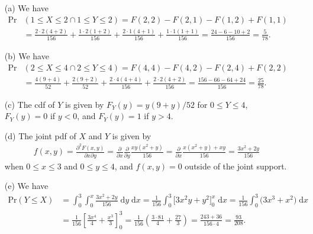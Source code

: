 \documentclass[10pt]{article}
\begin{document}
\begin{itemize}
    \item[(a)] We have 
    \begin{align*}
        \mathrm{Pr}&(1 \le X \le 2 \cap 1 \le Y \le 2)
        = F(2,2) - F(2,1) - F(1,2) + F(1,1) \\
        &= \frac{2 \cdot 2 (4 + 2)}{156} + \frac{1 \cdot 2 (1 + 2)}{156} + \frac{2 \cdot 1 (4 + 1)}{156} + \frac{1 \cdot 1 (1 + 1)}{156}
        = \frac{24 - 6 - 10 + 2}{156}
        = \frac{5}{78}.
    \end{align*}
    \item[(b)] We have 
    \begin{align*}
        \mathrm{Pr}&(2 \le X \le 4 \cap 2 \le Y \le 4) 
        = F(4,4) - F(4,2) - F(2,4) + F(2,2) \\
        &= \frac{4 (9 + 4)}{52} + \frac{2 (9 + 2)}{52} + \frac{2 \cdot 4 (4 + 4)}{156} + \frac{2 \cdot 2 (4 + 2)}{156}
        = \frac{156 - 66 - 64 + 24}{156}
        = \frac{25}{78}.
    \end{align*}
    \item[(c)] The cdf of \(Y\) is given by \(F_Y(y) = y(9 + y)/52\) for \(0 \le Y \le 4\), \(F_Y(y) = 0\) if \(y < 0\), and \(F_Y(y) = 1\) if \(y > 4\).
    \item[(d)] The joint pdf of \(X\) and \(Y\) is given by 
    \begin{align*}
        f(x,y) = \frac{\partial^2 F(x,y)}{\partial x \partial y} 
        = \frac{\partial}{\partial x} \frac{\partial}{\partial y} \frac{xy(x^2 + y)}{156} 
        = \frac{\partial}{\partial x} \frac{x(x^2 + y) + xy}{156}
        = \frac{3x^2 + 2y}{156}
    \end{align*}
    when \(0 \le x \le 3\) and \(0 \le y \le 4\), and \(f(x,y) = 0\) outside of the joint support. 
    \item[(e)] We have 
    \begin{align*}
        \mathrm{Pr}(Y \le X)
        &= \int_0^3 \int_0^x \frac{3x^2 + 2y}{156} \;\mathrm{d}y \;\mathrm{d}x
        = \frac{1}{156} \int_0^3 \big[ 3 x^2 y + y^2 \big]_0^x \;\mathrm{d}x 
        = \frac{1}{156} \int_0^3 \big( 3x^3 + x^2 \big) \;\mathrm{d}x \\
        &= \frac{1}{156} \left[ \frac{3x^4}{4} + \frac{x^3}{3} \right]_0^3
        = \frac{1}{156} \left( \frac{3 \cdot 81}{4} + \frac{27}{3} \right)
        = \frac{243 + 36}{156 \cdot 4} 
        = \frac{93}{208}.
    \end{align*}
\end{itemize}
\end{document}
